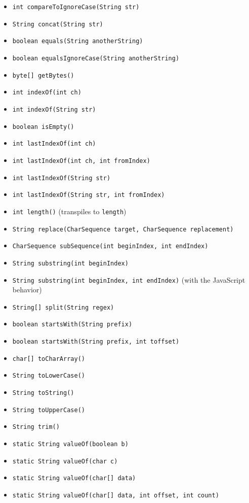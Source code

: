 \documentclass[a4paper]{report}
\begin{document}
\begin{itemize}
\begin{itemize}
\begin{itemize}
				\item \texttt{int compareToIgnoreCase(String str)} 
				\item \texttt{String concat(String str)} 
				\item \texttt{boolean equals(String anotherString)} 
				\item \texttt{boolean equalsIgnoreCase(String anotherString)} 				
				\item \texttt{byte[] getBytes()} 
				\item \texttt{int indexOf(int ch)}
				\item \texttt{int	indexOf(String str)}
				\item \texttt{boolean isEmpty()}
				\item \texttt{int lastIndexOf(int ch)}
				\item \texttt{int lastIndexOf(int ch, int fromIndex)}
				\item \texttt{int lastIndexOf(String str)}
				\item \texttt{int lastIndexOf(String str, int fromIndex)}
				\item \texttt{int length()} (transpiles to \texttt{length})
				\item \texttt{String replace(CharSequence target, CharSequence replacement)}
				\item \texttt{CharSequence subSequence(int beginIndex, int endIndex)}
				\item \texttt{String substring(int beginIndex)}
				\item \texttt{String substring(int beginIndex, int endIndex)} (with the JavaScript behavior)
				\item \texttt{String[] split(String regex)}
				\item \texttt{boolean	startsWith(String prefix)}
				\item \texttt{boolean startsWith(String prefix, int toffset)}
				\item \texttt{char[] toCharArray()}
				\item \texttt{String	toLowerCase()}
				\item \texttt{String toString()}
				\item \texttt{String toUpperCase()}
				\item \texttt{String trim()}
				\item \texttt{static String valueOf(boolean b)}
				\item \texttt{static String valueOf(char c)}
				\item \texttt{static String valueOf(char[] data)}
				\item \texttt{static String valueOf(char[] data, int offset, int count)}

\end{itemize}
\end{itemize}
\end{itemize}
\end{document}

